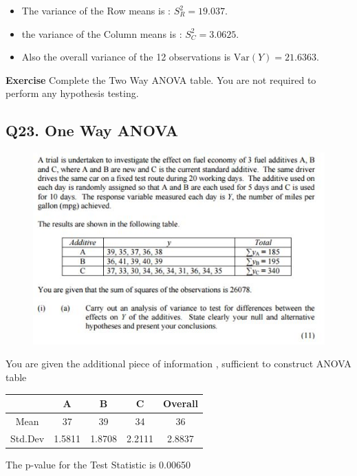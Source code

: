 \documentclass[a4paper,12pt]{article}
\begin{document}
\begin{itemize}
	\item The variance of the Row means is : $S^2_{R} = 19.037$. 
	\item the variance of the Column means is : $S^2_{C} = 3.0625$.	
	\item Also the overall variance of the 12 observations is $\textrm{Var}(Y) = 21.6363 $. 
\end{itemize}

\noindent \textbf{Exercise} Complete the Two Way ANOVA table. You are not required to perform any hypothesis testing.
\newpage
\subsection*{Q23. One Way ANOVA } %


\begin{figure}[h!]
\centering
\includegraphics[width=1.1\linewidth]{image/Q23Review}
\end{figure}
You are given the additional piece of information , sufficient to construct ANOVA table

{
\Large
\begin{center}
\begin{tabular}{|c|c|c|c||c|} 
	\hline  & A & B & C & Overall \\ 
	\hline Mean & 37 & 39& 34 &36 \\ 
	\hline Std.Dev &  1.5811 & 1.8708 & 2.2111 & 2.8837 \\
	
	\hline 
\end{tabular}
\end{center}
}
The p-value for the Test Statistic is 0.00650
\end{document}

